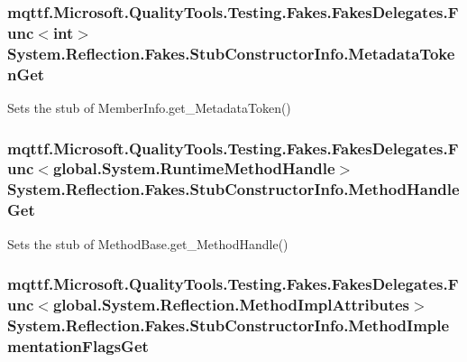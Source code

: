 \hypertarget{class_system_1_1_reflection_1_1_fakes_1_1_stub_constructor_info_a0d48672f2b03f1359e730dd1795f0247}{
\subsubsection[{Metadata\-Token\-Get}]{\setlength{\rightskip}{0pt plus 5cm}mqttf.\-Microsoft.\-Quality\-Tools.\-Testing.\-Fakes.\-Fakes\-Delegates.\-Func$<$int$>$ System.\-Reflection.\-Fakes.\-Stub\-Constructor\-Info.\-Metadata\-Token\-Get}}\label{class_system_1_1_reflection_1_1_fakes_1_1_stub_constructor_info_a0d48672f2b03f1359e730dd1795f0247}


Sets the stub of Member\-Info.\-get\-\_\-\-Metadata\-Token()

\hypertarget{class_system_1_1_reflection_1_1_fakes_1_1_stub_constructor_info_ad385756d8c89b4f825d97a1f7492ef82}{
\subsubsection[{Method\-Handle\-Get}]{\setlength{\rightskip}{0pt plus 5cm}mqttf.\-Microsoft.\-Quality\-Tools.\-Testing.\-Fakes.\-Fakes\-Delegates.\-Func$<$global.\-System.\-Runtime\-Method\-Handle$>$ System.\-Reflection.\-Fakes.\-Stub\-Constructor\-Info.\-Method\-Handle\-Get}}\label{class_system_1_1_reflection_1_1_fakes_1_1_stub_constructor_info_ad385756d8c89b4f825d97a1f7492ef82}


Sets the stub of Method\-Base.\-get\-\_\-\-Method\-Handle()

\hypertarget{class_system_1_1_reflection_1_1_fakes_1_1_stub_constructor_info_aae566f8a614c0544ce8ffa37bfa1b68c}{
\subsubsection[{Method\-Implementation\-Flags\-Get}]{\setlength{\rightskip}{0pt plus 5cm}mqttf.\-Microsoft.\-Quality\-Tools.\-Testing.\-Fakes.\-Fakes\-Delegates.\-Func$<$global.\-System.\-Reflection.\-Method\-Impl\-Attributes$>$ System.\-Reflection.\-Fakes.\-Stub\-Constructor\-Info.\-Method\-Implementation\-Flags\-Get}}\label{class_system_1_1_reflection_1_1_fakes_1_1_stub_constructor_info_aae566f8a614c0544ce8ffa37bfa1b68c}


